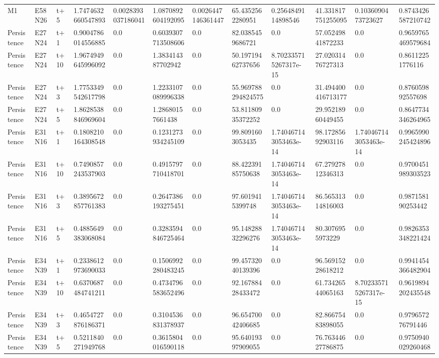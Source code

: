 \begin{landscape}
\begin{longtable}{llllllllllll}
M1 & E58N26 & t+5 & 1.7474632660547893 & 0.0028393037186041 & 1.0870892604192095 & 0.0026447146361447 & 65.4352562280951 & 0.2564849114898546 & 41.331817751255095 & 0.1036090473723627 & 0.8743426587210742 \\
Persistence & E27N24 & t+1 & 0.9004786014556885 & 0.0 & 0.6039307713508606 & 0.0 & 82.0385459686721 & 0.0 & 57.05249841872233 & 0.0 & 0.9659765469579684 \\
Persistence & E27N24 & t+10 & 1.9674949645996092 & 0.0 & 1.383414387702942 & 0.0 & 50.19719462737656 & 8.702335715267317e-15 & 27.02031476727313 & 0.0 & 0.86112251776116 \\
Persistence & E27N24 & t+3 & 1.7753349542617798 & 0.0 & 1.2233107089996338 & 0.0 & 55.969788294824575 & 0.0 & 31.494400416713177 & 0.0 & 0.876059892557698 \\
Persistence & E27N24 & t+5 & 1.8628538846969604 & 0.0 & 1.28680157661438 & 0.0 & 53.81180935372252 & 0.0 & 29.95218960449455 & 0.0 & 0.8647734346264965 \\
Persistence & E31N16 & t+1 & 0.1808210164308548 & 0.0 & 0.1231273934245109 & 0.0 & 99.8091603053435 & 1.740467143053463e-14 & 98.17285692903116 & 1.740467143053463e-14 & 0.9965990245424896 \\
Persistence & E31N16 & t+10 & 0.7490857243537903 & 0.0 & 0.4915797710418701 & 0.0 & 88.42239185750638 & 1.740467143053463e-14 & 67.27927812346313 & 0.0 & 0.9700451989303523 \\
Persistence & E31N16 & t+3 & 0.3895672857761383 & 0.0 & 0.2647386193275451 & 0.0 & 97.6019415399748 & 1.740467143053463e-14 & 86.56531314816003 & 0.0 & 0.987158190253442 \\
Persistence & E31N16 & t+5 & 0.4885649383068084 & 0.0 & 0.3283594846725464 & 0.0 & 95.14828832296276 & 1.740467143053463e-14 & 80.3076955973229 & 0.0 & 0.9826353348221424 \\
Persistence & E34N39 & t+1 & 0.2338612973690033 & 0.0 & 0.1506992280483245 & 0.0 & 99.45732040139396 & 0.0 & 96.56915228618212 & 0.0 & 0.9941454366482904 \\
Persistence & E34N39 & t+10 & 0.6370687484741211 & 0.0 & 0.4734796583652496 & 0.0 & 92.16788428433472 & 0.0 & 61.73426544065163 & 8.702335715267317e-15 & 0.9619894202435548 \\
Persistence & E34N39 & t+3 & 0.4654727876186371 & 0.0 & 0.3104536831378937 & 0.0 & 96.65470042406685 & 0.0 & 82.86675483898055 & 0.0 & 0.979657276791446 \\
Persistence & E34N39 & t+5 & 0.5211840271949768 & 0.0 & 0.3615804016590118 & 0.0 & 95.64019397909055 & 0.0 & 76.76344627786875 & 0.0 & 0.9750940029260468 \\

\end{longtable}
\end{landscape}
